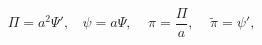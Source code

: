 \begin{equation}
\Pi = a^2 \Psi',~~~~\psi = a \Psi, ~~~~~\pi = \frac{\Pi}{a},~~~~~\tilde{\pi} = \psi',
\label{def}
\end{equation}

